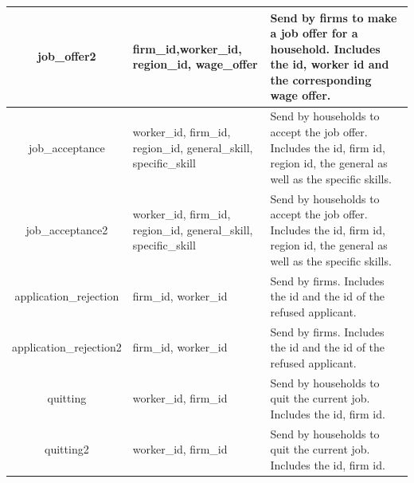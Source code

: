 \begin{table}[!htb]
\begin{center}
\begin{tabular}{|c|l|l|}
\hline


job\_offer2 & {\parbox[l]{5cm}{ firm\_id,worker\_id, region\_id,
wage\_offer}} & {\parbox[l]{5cm}{Send by firms to make a job offer
for a household. Includes the id, worker id and the
corresponding wage offer.}}   \\
\hline


job\_acceptance & {\parbox[l]{5cm}{worker\_id, firm\_id, region\_id,
general\_skill, specific\_skill}} & {\parbox[l]{5cm}{Send by
households to accept the job offer. Includes the id, firm id, region
id, the general
as well as the specific skills.}}   \\
\hline



job\_acceptance2 & {\parbox[l]{5cm}{worker\_id, firm\_id,
region\_id, general\_skill, specific\_skill}} &
{\parbox[l]{5cm}{Send by households to accept the job offer.
Includes the id, firm id, region id, the general
as well as the specific skills.}}   \\
\hline

application\_rejection & {\parbox[l]{5cm}{firm\_id, worker\_id}} &
{\parbox[l]{5cm}{Send by firms. Includes the id and the id of the refused applicant.}}   \\
\hline

application\_rejection2 & {\parbox[l]{5cm}{firm\_id, worker\_id}} &
{\parbox[l]{5cm}{Send by firms. Includes the id and the id of the refused applicant.}}   \\
\hline

quitting & {\parbox[l]{5cm}{worker\_id, firm\_id}} &
{\parbox[l]{5cm}{Send by households to quit the current job. Includes the id, firm id.}}   \\
\hline

quitting2 & {\parbox[l]{5cm}{worker\_id, firm\_id}} &
{\parbox[l]{5cm}{Send by households to quit the current job. Includes the id, firm id.}}   \\
\hline

\end{tabular}\end{center}\label{tab:labourmarketmsg}
\end{table}
